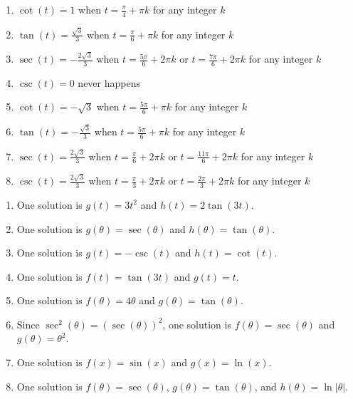 \documentclass{ximera}
\begin{document}
\begin{enumerate}

\setcounter{enumi}{\value{HW}}

\item $\cot(t) = 1$ when $t = \frac{\pi}{4} + \pi k$ for any integer $k$
\item  $\tan(t) = \frac{\sqrt{3}}{3}$ when $t = \frac{\pi}{6} + \pi k$ for any integer $k$
\item $\sec(t) = -\frac{2\sqrt{3}}{3}$ when $t = \frac{5\pi}{6} + 2\pi k$ or $t = \frac{7\pi}{6} + 2\pi k$ for any integer $k$
\item $\csc(t) = 0$ never happens 
\item $\cot(t) = -\sqrt{3}$ when $t = \frac{5\pi}{6} + \pi k$ for any integer $k$
\item $\tan(t) = -\frac{\sqrt{3}}{3}$ when $t = \frac{5\pi}{6} + \pi k$ for any integer $k$
\item $\sec(t) = \frac{2\sqrt{3}}{3}$ when $t = \frac{\pi}{6} + 2\pi k$ or $t = \frac{11\pi}{6} + 2\pi k$ for any integer $k$
\item $\csc(t) = \frac{2\sqrt{3}}{3}$ when $t = \frac{\pi}{3} + 2\pi k$ or $t = \frac{2\pi}{3} + 2\pi k$ for any integer $k$

\setcounter{HW}{\value{enumi}}
\end{enumerate}

\begin{enumerate}
\setcounter{enumi}{\value{HW}}

\item  One solution is $g(t) = 3t^2$ and $h(t) = 2\tan(3t)$.

\item  One solution is $g(\theta) = \sec(\theta)$ and $h(\theta) = \tan(\theta)$.

\item  One solution is $g(t) = -\csc(t)$ and $h(t) = \cot(t)$.

\item  One solution is $f(t) = \tan(3t)$ and $g(t) = t$.

\item  One solution is $f(\theta) = 4 \theta$ and $g(\theta) = \tan(\theta)$.

\item  Since $\sec^{2}(\theta) = (\sec(\theta))^2$, one solution is $f(\theta) = \sec(\theta)$ and $g(\theta) = \theta^2$.

\item  One solution is $f(x) = \sin(x)$ and $g(x) = \ln(x)$.

\item  One solution is $f(\theta) = \sec(\theta)$, $g(\theta) = \tan(\theta)$, and $h(\theta) = \ln| \theta|$.

\setcounter{HW}{\value{enumi}}
\end{enumerate}
\end{document}
